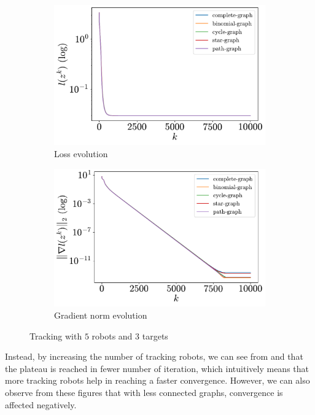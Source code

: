\documentclass[a4paper,11pt,oneside]{book}
\begin{document}
\begin{figure}[H]
      \centering
      \begin{subfigure}[t]{0.46\linewidth}
            \centering
            \includegraphics[width=\linewidth]{./figs/tracking/5_3_2/loss.pdf} 
            \caption{Loss evolution}
      \end{subfigure}
      \hfill
      \begin{subfigure}[t]{0.46\linewidth}
            \centering
            \includegraphics[width=\linewidth]{./figs/tracking/5_3_2/gradient.pdf} 
            \caption{Gradient norm evolution}
      \end{subfigure}
      \caption{Tracking with $5$ robots and $3$ targets}
      \label{fig:tracking_5_3}
\end{figure}

Instead, by increasing the number of tracking robots, we can see from  and  that the plateau is reached in fewer number of iteration, which intuitively means that more tracking robots help in reaching a faster convergence. However, we can also observe from these figures that with less connected graphs, convergence is affected negatively.
\end{document}
